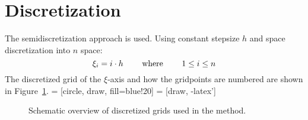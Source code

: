 \documentclass{article}
\begin{document}
\section{Discretization}

The semidiscretization approach is used. Using constant stepsize $h$ and space discretization into $n$ space:
\begin{equation}
    \xi_i = i \cdot h \hspace{0.8cm} \text{where}  \hspace{0.8cm} 1 \leq i \leq n 
\end{equation}
The discretized grid of the $\xi$-axis and how the gridpoints are numbered are shown in Figure~\ref{discret}.
 = [circle, draw, fill=blue!20]
 = [draw, -latex']
\begin{figure}[!h]
  \centering
  \caption{Schematic overview of discretized grids used in the method.}
  \label{discret}
\end{figure}
\end{document}
